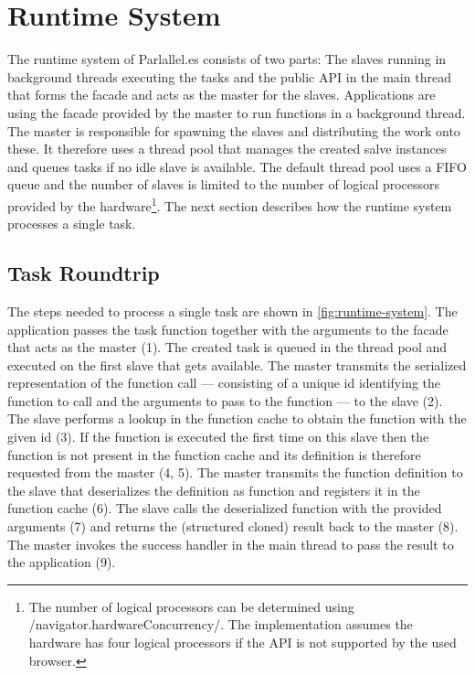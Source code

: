 \section{Runtime System}\label{sec:runtime-system}
The runtime system of Parlallel.es consists of two parts: The slaves running in background threads executing the tasks and the public API in the main thread that forms the facade and acts as the master for the slaves. Applications are using the facade provided by the master to run functions in a background thread. The master is responsible for spawning the slaves and distributing the work onto these. It therefore uses a thread pool that manages the created salve instances and queues tasks if no idle slave is available. The default thread pool uses a FIFO queue and the number of slaves is limited to the number of logical processors provided by the hardware\footnote{The number of logical processors can be determined using \javascriptinline/navigator.hardwareConcurrency/. The implementation assumes the hardware has four logical processors if the API is not supported by the used browser.}. The next section describes how the runtime system processes a single task. 

\subsection{Task Roundtrip}
The steps needed to process a single task are shown in \cref{fig:runtime-system}. The application passes the task function together with the arguments to the facade that acts as the master (1). The created task is queued in the thread pool and executed on the first slave that gets available. The master transmits the serialized representation of the function call --- consisting of a unique id identifying the function to call and the arguments to pass to the function --- to the slave (2). The slave performs a lookup in the function cache to obtain the function with the given id (3). If the function is executed the first time on this slave then the function is not present in the function cache and its definition is therefore requested from the master (4, 5). The master transmits the function definition to the slave that deserializes the definition as function and registers it in the function cache (6). The slave calls the deserialized function with the provided arguments (7) and returns the (structured cloned) result back to the master (8). The master invokes the success handler in the main thread to pass the result to the application (9). 

